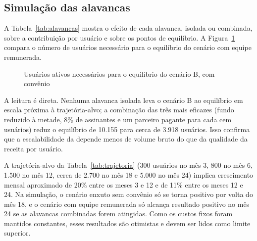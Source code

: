 \subsection{Simulação das alavancas}

A Tabela~\ref{tab:alavancas} mostra o efeito de cada alavanca, isolada ou combinada, sobre a contribuição por usuário e sobre os pontos de equilíbrio. A Figura~\ref{fig:equilibrio} compara o número de usuários necessário para o equilíbrio do cenário com equipe remunerada.



\begin{figure}[htb]
\centering
\caption{Usuários ativos necessários para o equilíbrio do cenário B, com convênio}
\label{fig:equilibrio}
\fonteautores
\end{figure}

A leitura é direta. Nenhuma alavanca isolada leva o cenário B ao equilíbrio em escala próxima à trajetória-alvo; a combinação das três mais eficazes (fundo reduzido à metade, 8\% de assinantes e um parceiro pagante para cada cem usuários) reduz o equilíbrio de 10.155 para cerca de 3.918 usuários. Isso confirma que a escalabilidade da \projeto{} depende menos de volume bruto do que da qualidade da receita por usuário.



A trajetória-alvo da Tabela~\ref{tab:trajetoria} (300 usuários no mês 3, 800 no mês 6, 1.500 no mês 12, cerca de 2.700 no mês 18 e 5.000 no mês 24) implica crescimento mensal aproximado de 20\% entre os meses 3 e 12 e de 11\% entre os meses 12 e 24. Na simulação, o cenário enxuto sem convênio só se torna positivo por volta do mês 18, e o cenário com equipe remunerada só alcança resultado positivo no mês 24 se as alavancas combinadas forem atingidas. Como os custos fixos foram mantidos constantes, esses resultados são otimistas e devem ser lidos como limite superior.
